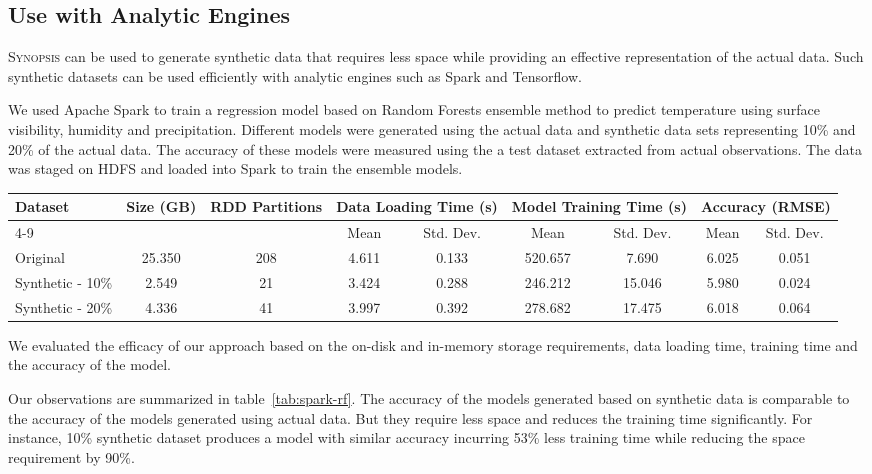 \subsection{Use with Analytic Engines}
\textsc{Synopsis} can be used to generate synthetic data that requires less space while providing an effective representation of the actual data.
Such synthetic datasets can be used efficiently with analytic engines such as Spark and Tensorflow.

We used Apache Spark to train a regression model based on Random Forests ensemble method to predict temperature using surface visibility, humidity and precipitation.
Different models were generated using the actual data and synthetic data sets representing 10\% and 20\% of the actual data.
The accuracy of these models were measured using the a test dataset extracted from actual observations.
The data was staged on HDFS and loaded into Spark to train the ensemble models.
%
\begin{table*}
    \renewcommand{\arraystretch}{1.3}
    \caption{Comparing Random Forest based regression models generated by Spark MLlib using synthetic vs. real data}
    \label{tab:spark-rf}
    \begin{center}
        \begin{tabularx}{\textwidth}{|X|c|c|c|c|c|c|c|c|}
            \hline
            \multirow{2}{*}{Dataset} & \multirow{2}{*}{Size (GB)} & \multirow{2}{*}{RDD Partitions} & \multicolumn{2}{c|}{\cellcolor[gray]{0.7}Data Loading Time (s)} &\multicolumn{2}{c|}{\cellcolor[gray]{0.7}Model Training Time (s)} & \multicolumn{2}{c|}{\cellcolor[gray]{0.7}Accuracy (RMSE)}\\
            \cline{4-9}
             & & & \cellcolor[gray]{0.9}Mean & \cellcolor[gray]{0.9}Std. Dev.  &  \cellcolor[gray]{0.9}Mean & \cellcolor[gray]{0.9}Std. Dev. &  \cellcolor[gray]{0.9}Mean & \cellcolor[gray]{0.9}Std. Dev. \\
            \hline
            Original & 25.350 & 208 & 4.611 & 0.133 & 520.657 & 7.690 & 6.025 & 0.051 \\
            \hline
            Synthetic - 10\% & 2.549 & 21 & 3.424 & 0.288 & 246.212 & 15.046 & 5.980 & 0.024 \\
            \hline
            Synthetic - 20\% & 4.336 & 41 & 3.997 & 0.392 & 278.682 & 17.475 & 6.018 & 0.064 \\
            \hline
		\end{tabularx}
	\end{center}
\end{table*}
%
We evaluated the efficacy of our approach based on the on-disk and in-memory storage requirements, data loading time, training time and the accuracy of the model.

Our observations are summarized in table~\ref{tab:spark-rf}.
The accuracy of the models generated based on synthetic data is comparable to the accuracy of the models generated using actual data.
But they require less space and reduces the training time significantly.
For instance, 10\% synthetic dataset produces a model with similar accuracy incurring 53\% less training time while reducing the space requirement by 90\%. 